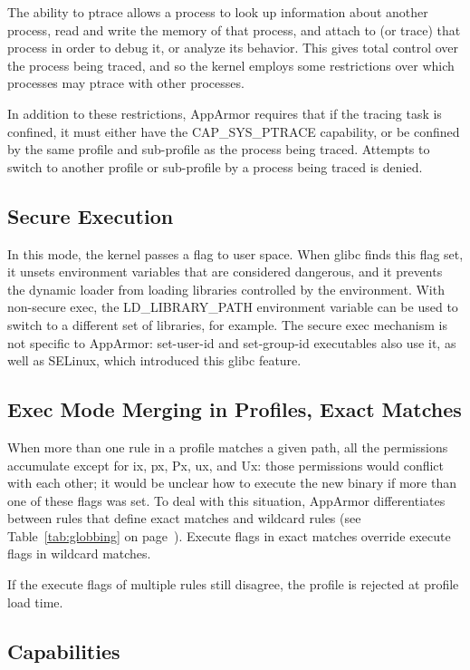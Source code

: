 \documentclass[a4paper]{article}
\renewcommand{\H}{\hspace{0pt}}
\begin{document}
The ability to ptrace allows a process to look up information about
another process, read and write the memory of that process, and attach
to (or trace) that process in order to debug it, or analyze its
behavior.  This gives total control over the process being traced, and
so the kernel employs some restrictions over which processes may ptrace
with other processes.

In addition to these restrictions, AppArmor requires that if the tracing
task is confined, it must either have the CAP\_{\H}SYS\_{\H}PTRACE capability,
or be confined by the same profile and sub-profile as the process being
traced.  Attempts to switch to another profile or sub-profile by a
process being traced is denied.


\subsection{Secure Execution}
\label{sec:secure-exec}

In this mode, the kernel passes a flag to user space.  When glibc finds
this flag set, it unsets environment variables that are considered
dangerous, and it prevents the dynamic loader from loading libraries
controlled by the environment.  With non-secure exec, the
LD\_LIBRARY\_PATH environment variable can be used to switch to a
different set of libraries, for example.  The secure exec mechanism is
not specific to AppArmor: set-user-id and set-group-id executables also
use it, as well as SELinux, which introduced this glibc feature.


\subsection{Exec Mode Merging in Profiles, Exact Matches}
\label{sec:merging}

When more than one rule in a profile matches a given path, all the
permissions accumulate except for ix, px, Px, ux, and Ux: those
permissions would conflict with each other; it would be unclear how to
execute the new binary if more than one of these flags was set.  To deal
with this situation, AppArmor differentiates between rules that define
exact matches and wildcard rules (see Table~\ref{tab:globbing} on
page~\pageref{tab:globbing}).  Execute flags in exact matches override
execute flags in wildcard matches.

If the execute flags of multiple rules still disagree, the profile is
rejected at profile load time.


\subsection{Capabilities}
\end{document}
